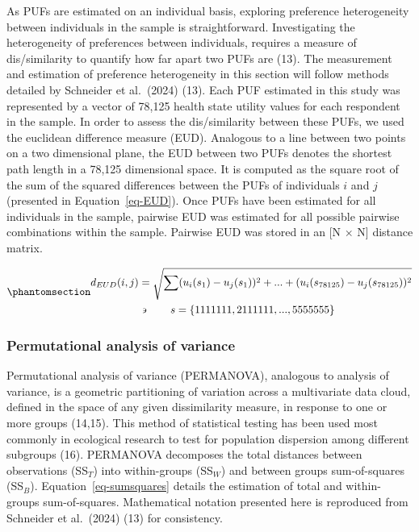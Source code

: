 \documentclass[
  letterpaper,
  DIV=11,
  numbers=noendperiod]{scrartcl}
\begin{document}
As PUFs are estimated on an individual basis, exploring preference
heterogeneity between individuals in the sample is straightforward.
Investigating the heterogeneity of preferences between individuals,
requires a measure of dis/similarity to quantify how far apart two PUFs
are (13). The measurement and estimation of preference heterogeneity in
this section will follow methods detailed by Schneider et al.~(2024)
(13). Each PUF estimated in this study was represented by a vector of
78,125 health state utility values for each respondent in the sample. In
order to assess the dis/similarity between these PUFs, we used the
euclidean difference measure (EUD). Analogous to a line between two
points on a two dimensional plane, the EUD between two PUFs denotes the
shortest path length in a 78,125 dimensional space. It is computed as
the square root of the sum of the squared differences between the PUFs
of individuals \(i\) and \(j\) (presented in Equation~\ref{eq-EUD}).
Once PUFs have been estimated for all individuals in the sample,
pairwise EUD was estimated for all possible pairwise combinations within
the sample. Pairwise EUD was stored in an {[}N \(\times\) N{]} distance
matrix.

\begin{equation}\phantomsection\label{eq-EUD}{ 
  \begin{aligned}
    d_{EUD}(i,j) & =\sqrt{\sum_{}^{}(u_{i}(s_{1})-u_{j}(s_{1}))^{2}+ ... +(u_{i}(s_{78125})-u_{j}(s_{78125}))^{2}}\\
      & \backepsilon \quad \quad s = \{1111111, 2111111, ..., 5555555\}\\
  \end{aligned}
}\end{equation}

\subsubsection{Permutational analysis of
variance}\label{permutational-analysis-of-variance}

Permutational analysis of variance (PERMANOVA), analogous to analysis of
variance, is a geometric partitioning of variation across a multivariate
data cloud, defined in the space of any given dissimilarity measure, in
response to one or more groups (14,15). This method of statistical
testing has been used most commonly in ecological research to test for
population dispersion among different subgroups (16). PERMANOVA
decomposes the total distances between observations (SS\(_T\)) into
within-groups (SS\(_W\)) and between groups sum-of-squares (SS\(_B\)).
Equation~\ref{eq-sumsquares} details the estimation of total and
within-groups sum-of-squares. Mathematical notation presented here is
reproduced from Schneider et al.~(2024) (13) for consistency.
\end{document}
